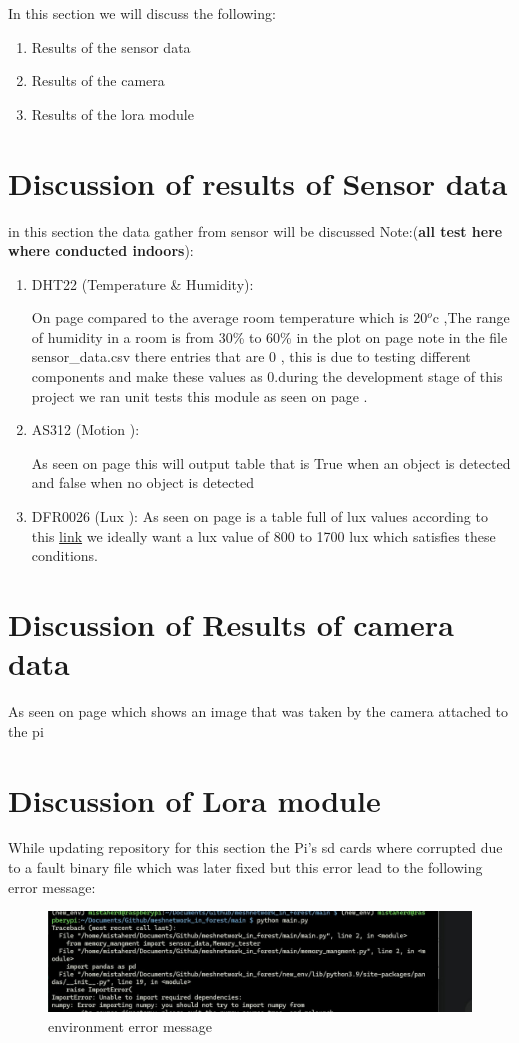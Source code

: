 In this section we will discuss the following:
\begin{enumerate}
    \item Results of the sensor data
    \item Results of the camera
    \item Results of the lora module
\end{enumerate}
\section{Discussion of results of Sensor data}
in this section the data gather from sensor will be discussed Note:(\textbf{all test here where conducted indoors}):
\begin{enumerate}
    \item DHT22 (Temperature \& Humidity):

    On page \pageref{Recorded data from  DHT22 on the 5th of march} compared to the average room temperature which is  20$^o$c ,The range of humidity in a room is from 30\% to 60\% in the plot on page \pageref{Temperature and Humidity plotted overtime} note in the file sensor_data.csv there entries  that are 0 , this is due to  testing different components and make these values as  0.during the development stage of this project we ran unit tests  this module as seen on page \pageref{unit test message for DHT22 module}.
    \item AS312 (Motion ):

    As seen on page \pageref{Recorded data from AS312 on the \today} this will output table that is True when an object is detected and  false when no object is  detected

    \item DFR0026 (Lux ):
    As seen on page \pageref{Recorded data from DFR0026 on the 25th of march 2024} is a table full of  lux values according to  this \href{https://www.thoughtco.com/lighting-levels-by-room-1206643}{link} we ideally want a lux value  of  800 to 1700 lux which satisfies these conditions.
\end{enumerate}
\section{Discussion of Results of camera data}
As seen on page \pageref{A photo from 25th of march 2024} which shows  an image that was taken by the camera  attached to  the pi
\section{Discussion of Lora module}
\label{Discussion of Lora module}
While updating repository for this section the Pi's sd cards where corrupted due to  a fault binary file which was  later fixed  but  this error lead to the following error message:

\begin{figure}[h!]
    \centering
    \includegraphics[width=0.5\linewidth]{Images/error_message.jpeg}
    \caption{environment error message}
\end{figure}